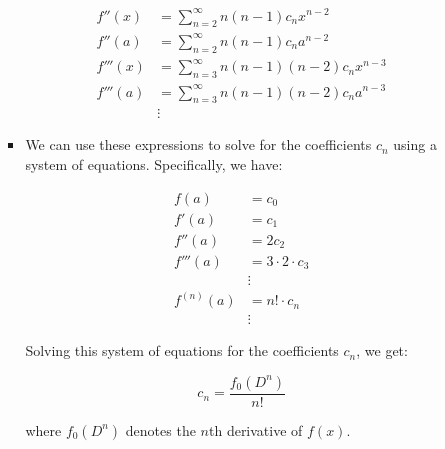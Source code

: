 \documentclass[12pt]{article}
\begin{document}
\begin{enumerate}[leftmargin=\labelsep]
\begin{enumerate}
\begin{itemize}[label={}]
            \begin{align*}
            f''(x) &= \sum_{n=2}^{\infty} n(n-1) c_n x^{n-2} \\
            f''(a) &= \sum_{n=2}^{\infty} n(n-1) c_n a^{n-2} \\
            f'''(x) &= \sum_{n=3}^{\infty} n(n-1)(n-2) c_n x^{n-3} \\
            f'''(a) &= \sum_{n=3}^{\infty} n(n-1)(n-2) c_n a^{n-3} \\
            &\vdots
            \end{align*}

            \item We can use these expressions to solve for the coefficients $c_n$ using a system of equations. Specifically, we have:

            \begin{align*}
            f(a) &= c_0 \\
            f'(a) &= c_1 \\
            f''(a) &= 2c_2 \\
            f'''(a) &= 3 \cdot 2 \cdot c_3 \\
            &\vdots \\
            f^{(n)}(a) &= n! \cdot c_n \\
            &\vdots
            \end{align*}

            Solving this system of equations for the coefficients $c_n$, we get:

            \begin{equation*}
            c_n = \frac{f_0(D^n)}{n!}
            \end{equation*}

            where $f_0(D^n)$ denotes the $n$th derivative of $f(x)$.
        \end{itemize}



\end{enumerate}
\end{enumerate}
\end{document}
